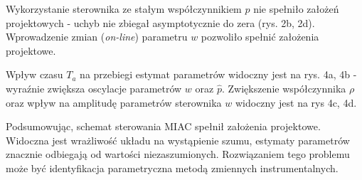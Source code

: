 \documentclass[10pt, a4paper]{article}
\begin{document}
Wykorzystanie sterownika ze stałym współczynnikiem $p$ nie spełniło założeń projektowych - uchyb nie zbiegał asymptotycznie do zera (rys. 2b, 2d). Wprowadzenie zmian (\textit{on-line}) parametru $w$ pozwoliło spełnić założenia projektowe. 

Wpływ czasu $T_a$ na przebiegi estymat parametrów widoczny jest na rys. 4a, 4b - wyraźnie zwiększa oscylacje parametrów $w$ oraz $\hat{p}$. Zwiększenie współczynnika $\rho$ oraz wpływ na amplitudę parametrów sterownika $w$ widoczny jest na rys 4c, 4d.

Podsumowując, schemat sterowania MIAC spełnił założenia projektowe. Widoczna jest wrażliwość układu na wystąpienie szumu, estymaty parametrów znacznie odbiegają od wartości niezaszumionych. Rozwiązaniem tego problemu może być identyfikacja parametryczna metodą zmiennych instrumentalnych. 
\end{document}

